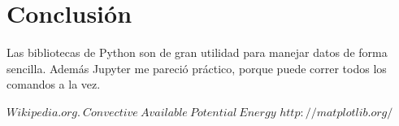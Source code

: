 \documentclass[a4paper]{article}
\begin{document}
\begin{table}[htbp]
\begin{center}
\caption{observaciones realizadas a las 00Z y 12Z horas.}
\end{center}

\end{table}
\newpage
\section*{Conclusión}
Las bibliotecas de Python son de gran utilidad para manejar datos de forma sencilla. Además Jupyter me pareció práctico, porque puede correr todos los comandos a la vez.

\begin{thebibliography}{10}
 \textsc{$Wikipedia.org. \ Convective\ Available\ Potential\ Energy$}
 \textsc{$http://matplotlib.org/$}
\end{thebibliography}
\end{document}
